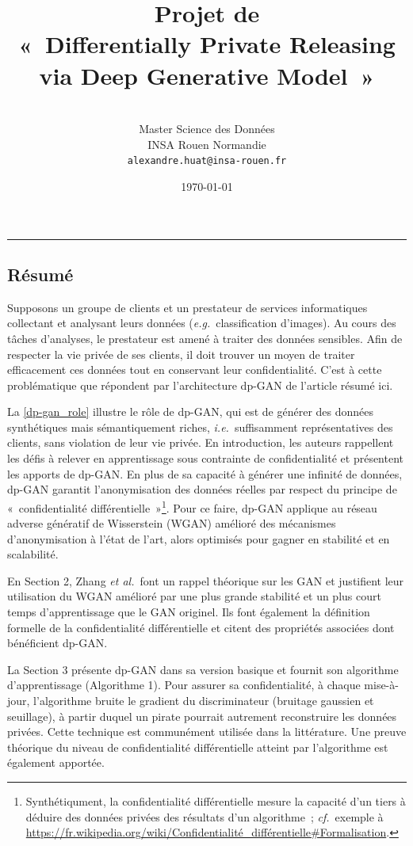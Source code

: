 \documentclass[a4paper,11pt]{article}
\title{\textbf{Projet de \DL}\\« Differentially Private Releasing via Deep Generative Model »}
\author{\textbf{\AH}\\Master Science des Données\\INSA Rouen Normandie\\\texttt{alexandre.huat@insa-rouen.fr}}
\date{\today}
\theoremstyle{definition}
\newcommand{\eg}{\textit{e.g.}}
\newcommand{\ie}{\textit{i.e.}}
\newcommand{\etal}{\textit{et al.}}
\newcommand{\cf}{\textit{cf.}}
\begin{document}
\maketitle
\hrule height 0.8pt

\begin{multicols}{2}
\section{Résumé}
Supposons un groupe de clients et un prestateur de services informatiques collectant et analysant leurs données (\eg\ classification d'images). Au cours des tâches d'analyses, le prestateur est amené à traiter des données sensibles. Afin de respecter la vie privée de ses clients, il doit trouver un moyen de traiter efficacement ces données tout en conservant leur confidentialité. C'est à cette problématique que répondent \citet{ref} par l'architecture dp-GAN de l'article résumé ici.

La \autoref{dp-gan_role} illustre le rôle de dp-GAN, qui est de générer des données synthétiques mais sémantiquement riches, \ie\ suffisamment représentatives des clients, sans violation de leur vie privée.
En introduction, les auteurs rappellent les défis à relever en apprentissage sous contrainte de confidentialité et présentent les apports de dp-GAN. En plus de sa capacité à générer une infinité de données, dp-GAN garantit l'anonymisation des données réelles par respect du principe de « confidentialité différentielle »\footnote{Synthétiqument, la confidentialité différentielle mesure la capacité d'un tiers à déduire des données privées des résultats d'un algorithme ; \cf\ exemple à \url{https://fr.wikipedia.org/wiki/Confidentialité_différentielle#Formalisation}.}.
Pour ce faire, dp-GAN applique au réseau adverse génératif de Wisserstein (WGAN) amélioré des mécanismes d'anonymisation à l'état de l'art, alors optimisés pour gagner en stabilité et en scalabilité.

En Section 2, Zhang \etal\ font un rappel théorique sur les GAN et justifient leur utilisation du WGAN amélioré par une plus grande stabilité et un plus court temps d'apprentissage que le GAN originel. Ils font également la définition formelle de la confidentialité différentielle et citent des propriétés associées dont bénéficient dp-GAN.

La Section 3 présente dp-GAN dans sa version basique et fournit son algorithme d'apprentissage (Algorithme 1). Pour assurer sa confidentialité, à chaque mise-à-jour, l'algorithme bruite le gradient du discriminateur (bruitage gaussien et seuillage), à partir duquel un pirate pourrait autrement reconstruire les données privées. Cette technique est communément utilisée dans la littérature. Une preuve théorique du niveau de confidentialité différentielle atteint par l'algorithme est également apportée.


\end{multicols}
\end{document}
